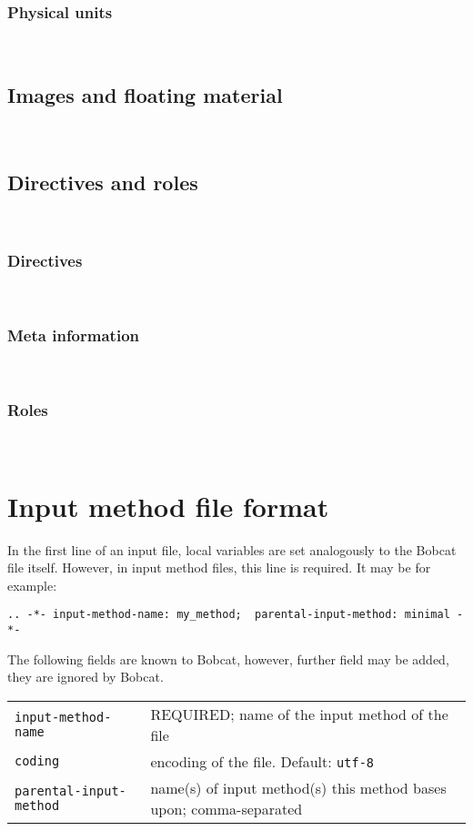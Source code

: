\documentclass[12pt,openany]{book}
\begin{document}
~


\subsubsection{Physical units}

~

\subsection{Images and floating material}


~

\subsection{Directives and roles}

~

\subsubsection{Directives}

~

\subsubsection{Meta information}

~

\subsubsection{Roles}

~


\section{Input method file format}

In the first line of an input file, local variables are set analogously to the
Bobcat file itself.  However, in input method files, this line is required.  It
may be for example:

\begin{lstlisting}
.. -*- input-method-name: my_method;  parental-input-method: minimal -*-
\end{lstlisting}

The following fields are known to Bobcat, however, further field may be added,
they are ignored by Bobcat.

\begin{center}
\begin{tabular}{@{}lp{7cm}@{}}
  \toprule
  \verb|input-method-name| & REQUIRED; name of the input method of the file \\
  \verb|coding| & encoding of the file.  Default: \verb|utf-8|\\
  \verb|parental-input-method| & name(s) of input method(s) this method bases
  upon; comma-separated\\
  \bottomrule
\end{tabular}
\end{center}
\end{document}
